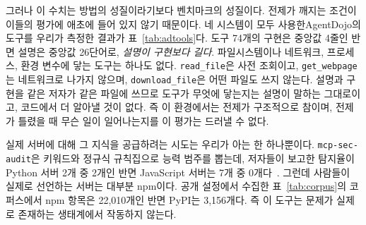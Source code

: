 \documentclass[acmsmall,screen,review,anonymous]{acmart}
\begin{document}
그러나 이 수치는 방법의 성질이라기보다 벤치마크의 성질이다. 전제가 깨지는 조건이 이들의 평가에 애초에 들어 있지 않기 때문이다. 네 시스템이 모두 사용한AgentDojo의 도구를 우리가 측정한 결과가 표~\ref{tab:adtools}다. 도구 74개의 구현은 중앙값 4줄인 반면 설명은 중앙값 26단어로, \emph{설명이 구현보다 길다}. 파일시스템이나 네트워크, 프로세스, 환경 변수에 닿는 도구는 하나도 없다. \texttt{read\_file}은 사전 조회이고, \texttt{get\_webpage}는 네트워크로 나가지 않으며, \texttt{download\_file}은 어떤 파일도 쓰지 않는다. 설명과 구현을 같은 저자가 같은 파일에 쓰므로 도구가 무엇에 닿는지는 설명이 말하는 그대로이고, 코드에서 더 알아낼 것이 없다. 즉 이 환경에서는 전제가 구조적으로 참이며, 전제가 틀렸을 때 무슨 일이 일어나는지를 이 평가는 드러낼 수 없다.

실제 서버에 대해 그 지식을 공급하려는 시도는 우리가 아는 한 하나뿐이다. \texttt{mcp-sec-audit}은 키워드와 정규식 규칙집으로 능력 범주를 뽑는데, 저자들이 보고한 탐지율이 Python 서버 2개 중 2개인 반면 JavaScript 서버는 7개 중 0개다~\cite{huang2026auditing}. 그런데 사람들이 실제로 선언하는 서버는 대부분 npm이다. 공개 설정에서 수집한 표~\ref{tab:corpus}의 코퍼스에서 npm 항목은 22,010개인 반면 PyPI는 3,156개다. 즉 이 도구는 문제가 실제로 존재하는 생태계에서 작동하지 않는다.
\end{document}
